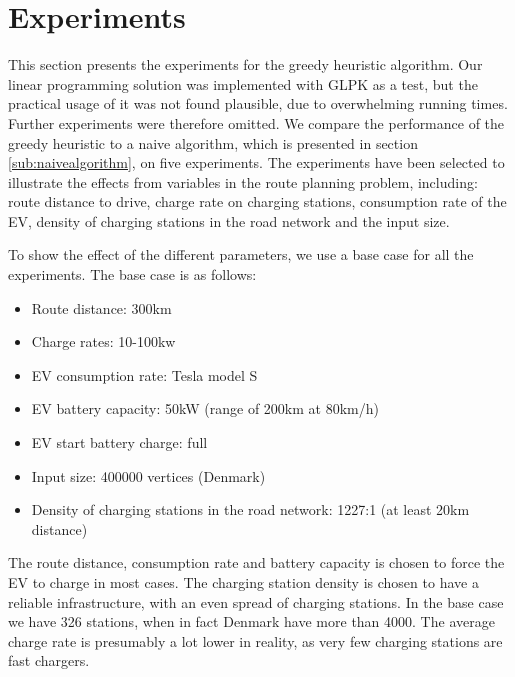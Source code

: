 \section{Experiments}
\label{sec:experiments}
This section presents the experiments for the greedy heuristic algorithm. Our linear programming solution was implemented with GLPK as a test, but the practical usage of it was not found plausible, due to overwhelming running times. Further experiments were therefore omitted. We compare the performance of the greedy heuristic to a naive algorithm, which is presented in section \ref{sub:naivealgorithm}, on five experiments. The experiments have been selected to illustrate the effects from variables in the route planning problem, including: route distance to drive, charge rate on charging stations, consumption rate of the EV, density of charging stations in the road network and the input size.

To show the effect of the different parameters, we use a base case for all the experiments. The base case is as follows:
\begin{itemize}
     \item Route distance: 300km
     \item Charge rates: 10-100kw
     \item EV consumption rate: Tesla model S\cite{teslacon}
     \item EV battery capacity: 50kW (range of 200km at 80km/h)
	 \item EV start battery charge: full
	 \item Input size: 400000 vertices (Denmark)
     \item Density of charging stations in the road network: 1227:1 (at least 20km distance)
 \end{itemize} 

The route distance, consumption rate and battery capacity is chosen to force the EV to charge in most cases. The charging station density is chosen to have a reliable infrastructure, with an even spread of charging stations. In the base case we have 326 stations, when in fact Denmark have more than 4000\cite{Globalevoutlook}. The average charge rate is presumably a lot lower in reality, as very few charging stations are fast chargers.


















